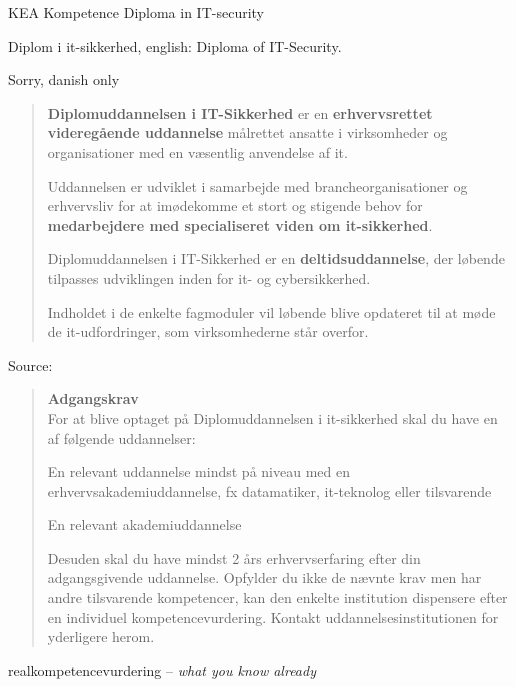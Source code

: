\documentclass[Screen16to9,17pt]{foils}
\begin{document}
\mytitlepage
{KEA Kompetence Diploma in IT-security}
{}


{\Large Diplom i it-sikkerhed, english: Diploma of IT-Security.}

Sorry, danish only
\begin{quote}
{\bf Diplomuddannelsen i IT-Sikkerhed} er en {\bf erhvervsrettet videregående uddannelse} målrettet ansatte i virksomheder og organisationer med en væsentlig anvendelse af it.

Uddannelsen er udviklet i samarbejde med brancheorganisationer og erhvervsliv for at imødekomme et stort og stigende behov for {\bf medarbejdere med specialiseret viden om it-sikkerhed}.

Diplomuddannelsen i IT-Sikkerhed er en {\bf deltidsuddannelse}, der løbende tilpasses udviklingen inden for it- og cybersikkerhed.

Indholdet i de enkelte fagmoduler vil løbende blive opdateret til at møde de it-udfordringer, som virksomhederne står overfor.
\end{quote}
Source: 


\begin{quote}
{\bf Adgangskrav}\\
For at blive optaget på Diplomuddannelsen i it-sikkerhed skal du have en af følgende
uddannelser:

\begin{list2}
\item En relevant uddannelse mindst på niveau med en erhvervsakademiuddannelse, fx
datamatiker, it-teknolog eller tilsvarende

\item En relevant akademiuddannelse
\end{list2}

Desuden skal du have mindst 2 års erhvervserfaring efter din adgangsgivende
uddannelse.
Opfylder du ikke de nævnte krav men har andre tilsvarende kompetencer, kan den
enkelte institution dispensere efter en individuel kompetencevurdering. Kontakt
uddannelsesinstitutionen for yderligere herom.
\end{quote}

realkompetencevurdering -- \emph{what you know already}\\
\end{document}
